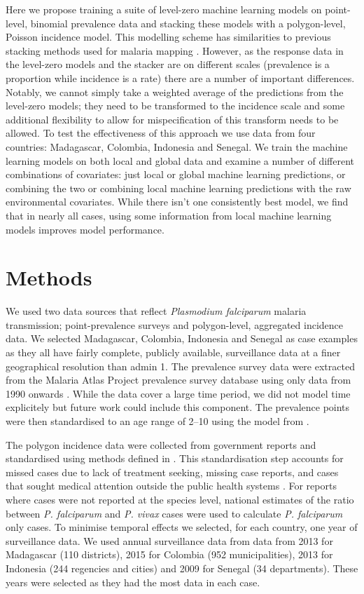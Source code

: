 \documentclass[11pt]{article}
\begin{document}
Here we propose training a suite of level-zero machine learning models on point-level, binomial prevalence data and stacking these models with a polygon-level, Poisson incidence model.
This modelling scheme has similarities to previous stacking methods used for malaria mapping \citep{bhatt2017improved}.
However, as the response data in the level-zero models and the stacker are on different scales (prevalence is a proportion while incidence is a rate) there are a number of important differences.
Notably, we cannot simply take a weighted average of the predictions from the level-zero models; they need to be transformed to the incidence scale and some additional flexibility to allow for mispecification of this transform needs to be allowed.
To test the effectiveness of this approach we use data from four countries: Madagascar, Colombia, Indonesia and Senegal.
We train the machine learning models on both local and global data and examine a number of different combinations of covariates: just local or global machine learning predictions, or combining the two or combining local machine learning predictions with the raw environmental covariates.
While there isn't one consistently best model, we find that in nearly all cases, using some information from local machine learning models improves model performance.


\section{Methods}

We used two data sources that reflect \emph{Plasmodium falciparum} malaria transmission; point-prevalence surveys and polygon-level, aggregated incidence data. 
We selected Madagascar, Colombia, Indonesia and Senegal as case examples as they all have fairly complete, publicly available, surveillance data at a finer geographical resolution than admin 1.
The prevalence survey data were extracted from the Malaria Atlas Project prevalence survey database using only data from 1990 onwards \citep{bhatt2015effect, guerra2007assembling, pfeffer2018ma}.
While the data cover a large time period, we did not model time explicitely but future work could include this component.
The prevalence points were then standardised to an age range of 2--10 using the model from \citep{smith2007standardizing}.

The polygon incidence data were collected from government reports and standardised using methods defined in \cite{cibulskis2011worldwide}.
This standardisation step accounts for missed cases due to lack of treatment seeking, missing case reports, and cases that sought medical attention outside the public health systems \citep{battle2016treatment}.
For reports where cases were not reported at the species level, national estimates of the ratio between \emph{P. falciparum} and \emph{P. vivax} cases were used to calculate \emph{P. falciparum} only cases. 
To minimise temporal effects we selected, for each country, one year of surveillance data. 
We used annual surveillance data from data from 2013 for Madagascar (110 districts), 2015 for Colombia (952 municipalities), 2013 for Indonesia (244 regencies and cities) and 2009 for Senegal (34 departments).
These years were selected as they had the most data in each case.
\end{document}

